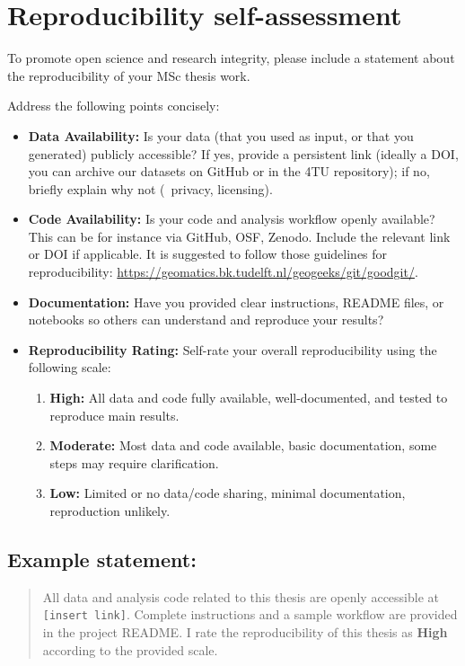 
\chapter{Reproducibility self-assessment}

To promote open science and research integrity, please include a statement about the reproducibility of your MSc thesis work. 

Address the following points concisely:
\begin{itemize}
  \item \textbf{Data Availability:} Is your data (that you used as input, or that you generated) publicly accessible? If yes, provide a persistent link (ideally a DOI, you can archive our datasets on GitHub or in the 4TU repository); if no, briefly explain why not (\eg\ privacy, licensing).
  \item \textbf{Code Availability:} Is your code and analysis workflow openly available? This can be for instance via GitHub, OSF, Zenodo. Include the relevant link or DOI if applicable. It is suggested to follow those guidelines for reproducibility: \url{https://geomatics.bk.tudelft.nl/geogeeks/git/goodgit/}.
  \item \textbf{Documentation:} Have you provided clear instructions, README files, or notebooks so others can understand and reproduce your results?
  \item \textbf{Reproducibility Rating:} Self-rate your overall reproducibility using the following scale:
    \begin{enumerate}
      \item \textbf{High:} All data and code fully available, well-documented, and tested to reproduce main results.
      \item \textbf{Moderate:} Most data and code available, basic documentation, some steps may require clarification.
      \item \textbf{Low:} Limited or no data/code sharing, minimal documentation, reproduction unlikely.
    \end{enumerate}
\end{itemize}

\section{Example statement:}

\begin{quote}
All data and analysis code related to this thesis are openly accessible at \texttt{[insert link]}. Complete instructions and a sample workflow are provided in the project README. I rate the reproducibility of this thesis as \textbf{High} according to the provided scale.
\end{quote}


